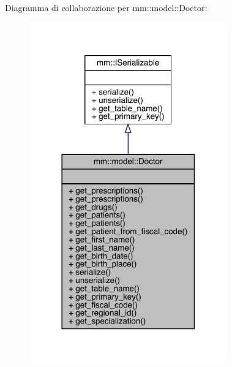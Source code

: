 Diagramma di collaborazione per mm\+:\+:model\+:\+:Doctor\+:
\nopagebreak
\begin{figure}[H]
\begin{center}
\leavevmode
\includegraphics[width=242pt]{da/d19/classmm_1_1model_1_1_doctor__coll__graph}
\end{center}
\end{figure}
